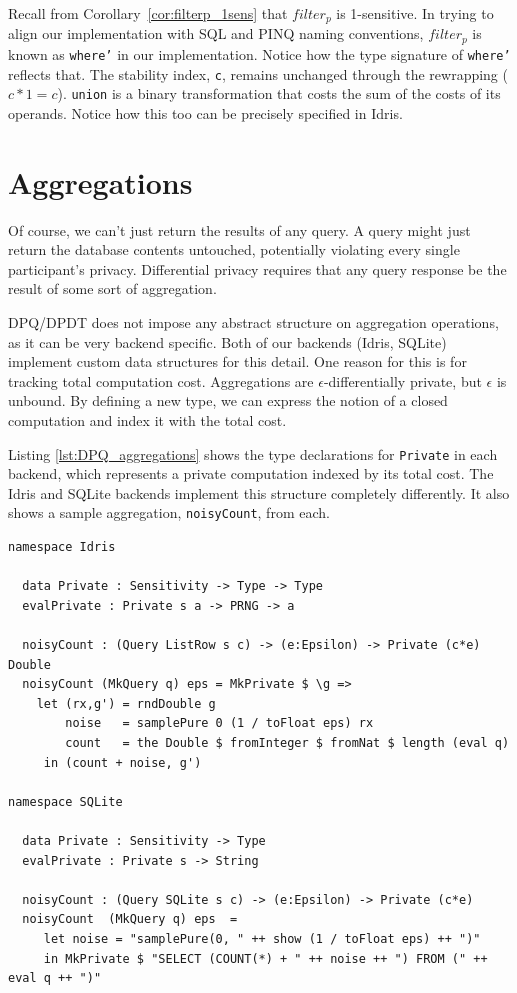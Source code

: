 \documentclass[12pt]{report}
\begin{document}
Recall from Corollary~\ref{cor:filterp_1sens} that $filter_p$ is 1-sensitive.
In trying to align our implementation with SQL and PINQ naming conventions, $filter_p$ is known as \texttt{where'} in our implementation.
Notice how the type signature of \texttt{where'} reflects that.
The stability index, \texttt{c}, remains unchanged through the rewrapping ($c * 1 = c$).
\texttt{union} is a binary transformation that costs the sum of the costs of its operands.
Notice how this too can be precisely specified in Idris.

\section{Aggregations}\label{seq:DPQ_aggregations}

Of course, we can't just return the results of any query.
A query might just return the database contents untouched, potentially violating every single participant's privacy.
Differential privacy requires that any query response be the result of some sort of aggregation.

DPQ/DPDT does not impose any abstract structure on aggregation operations, as it can be very backend specific.
Both of our backends (Idris, SQLite) implement custom data structures for this detail.
One reason for this is for tracking total computation cost.
Aggregations are $\epsilon$-differentially private, but $\epsilon$ is unbound.
By defining a new type, we can express the notion of a closed computation and index it with the total cost.

Listing \ref{lst:DPQ_aggregations} shows the type declarations for \texttt{Private} in each backend, which represents a private computation indexed by its total cost.
The Idris and SQLite backends implement this structure completely differently.
It also shows a sample aggregation, \texttt{noisyCount}, from each.

\begin{lstlisting}[float,caption={Noisy aggregations}, label={lst:DPQ_aggregations}]
namespace Idris

  data Private : Sensitivity -> Type -> Type
  evalPrivate : Private s a -> PRNG -> a

  noisyCount : (Query ListRow s c) -> (e:Epsilon) -> Private (c*e) Double
  noisyCount (MkQuery q) eps = MkPrivate $ \g =>
    let (rx,g') = rndDouble g
        noise   = samplePure 0 (1 / toFloat eps) rx
        count   = the Double $ fromInteger $ fromNat $ length (eval q)
     in (count + noise, g')

namespace SQLite

  data Private : Sensitivity -> Type
  evalPrivate : Private s -> String

  noisyCount : (Query SQLite s c) -> (e:Epsilon) -> Private (c*e)
  noisyCount  (MkQuery q) eps  =
     let noise = "samplePure(0, " ++ show (1 / toFloat eps) ++ ")"
     in MkPrivate $ "SELECT (COUNT(*) + " ++ noise ++ ") FROM (" ++ eval q ++ ")"
\end{lstlisting}
\end{document}

